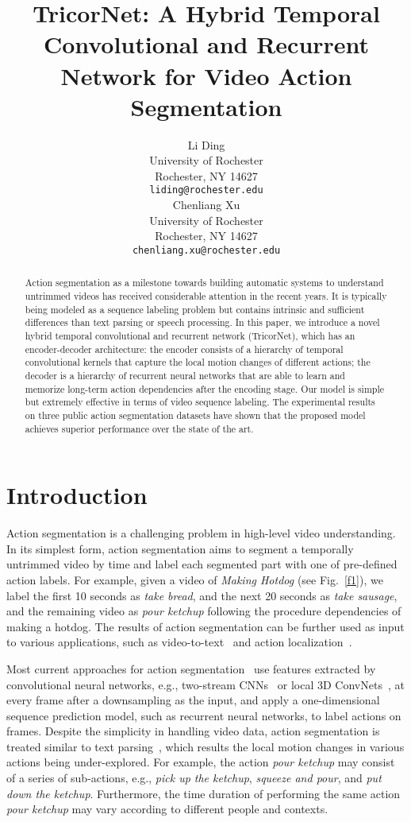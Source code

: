 \documentclass{article}
\title{TricorNet: A Hybrid Temporal Convolutional and Recurrent Network for Video Action Segmentation}
\author{
Li Ding \\
University of Rochester \\
Rochester, NY 14627 \\
\texttt{liding@rochester.edu} \\
\And
Chenliang Xu \\
University of Rochester \\
Rochester, NY 14627 \\
\texttt{chenliang.xu@rochester.edu}
}
\begin{document}
\maketitle

\begin{abstract}
Action segmentation as a milestone towards building automatic systems to understand untrimmed videos has received considerable attention in the recent years. It is typically being modeled as a sequence labeling problem but contains intrinsic and sufficient differences than text parsing or speech processing. In this paper, we introduce a novel hybrid temporal convolutional and recurrent network (TricorNet), which has an encoder-decoder architecture: the encoder consists of a hierarchy of temporal convolutional kernels that capture the local motion changes of different actions; the decoder is a hierarchy of recurrent neural networks that are able to learn and memorize long-term action dependencies after the encoding stage. Our model is simple but extremely effective in terms of video sequence labeling. The experimental results on three public action segmentation datasets have shown that the proposed model achieves superior performance over the state of the art. 
\end{abstract}



\section{Introduction}
\label{sec:intro}

Action segmentation is a challenging problem in high-level video understanding. In its simplest form, action segmentation aims to segment a temporally untrimmed video by time and label each segmented part with one of  pre-defined action labels. For example, given a video of \textit{Making Hotdog} (see Fig.~\ref{f1}), we label the first 10 seconds as \textit{take bread}, and the next 20 seconds as \textit{take sausage}, and the remaining video as \textit{pour ketchup} following the procedure dependencies of making a hotdog. The results of action segmentation can be further used as input to various applications, such as video-to-text~\cite{DaXuDoCVPR2013} and action localization~\cite{MeGeSnECCV2016}. 

Most current approaches for action segmentation~\cite{YeRuJiARXIV2015, SiMaJoCVPR2016, HuFeNiECCV2016} use features extracted by convolutional neural networks, e.g., two-stream CNNs~\cite{SiZiNIPS2014} or local 3D ConvNets~\cite{TrBoFeICCV2015}, at every frame after a downsampling as the input, and apply a one-dimensional sequence prediction model, such as recurrent neural networks, to label actions on frames. Despite the simplicity in handling video data, action segmentation is treated similar to text parsing~\cite{CrHuACL2016}, which results the local motion changes in various actions being under-explored. For example, the action \textit{pour ketchup} may consist of a series of sub-actions, e.g., \textit{pick up the ketchup}, \textit{squeeze and pour}, and \textit{put down the ketchup}. Furthermore, the time duration of performing the same action \textit{pour ketchup} may vary according to different people and contexts. 
\end{document}
